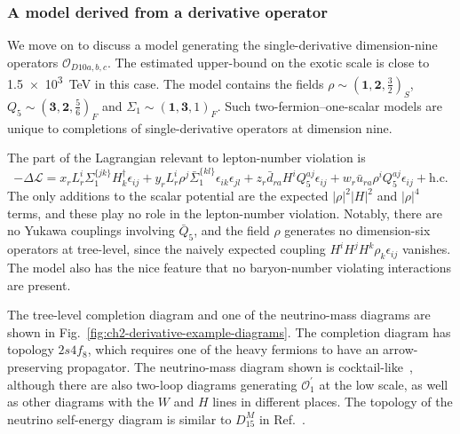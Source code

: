 \subsubsection{A model derived from a derivative operator}

We move on to discuss a model generating the single-derivative dimension-nine
operators $\mathcal{O}_{D10a,b,c}$. The estimated upper-bound on the exotic
scale is close to \SI{1.5e3}{\TeV} in this case. The model contains the fields
$\rho \sim (\mathbf{1}, \mathbf{2}, \tfrac{3}{2})_{S}$,
$Q_{5} \sim (\mathbf{3}, \mathbf{2}, \tfrac{5}{6})_{F}$ and
$\Sigma_{1} \sim (\mathbf{1}, \mathbf{3}, 1)_{F}$. Such two-fermion--one-scalar
models are unique to completions of single-derivative operators at dimension
nine.

The part of the Lagrangian relevant to lepton-number violation is
\begin{equation}
  - \Delta \mathscr{L} = x_{r} L_{r}^{i} \Sigma_{1}^{\{jk\}} H^{\dagger}_{k} \epsilon_{ij} + y_{r} L_{r}^{i} \rho^{j} \bar{\Sigma}_{1}^{\{kl\}}\epsilon_{ik}\epsilon_{jl} + z_{r} \bar{d}_{ra} H^{i} Q^{aj}_{5} \epsilon_{ij} + w_{r} \bar{u}_{ra} \rho^{i} Q_{5}^{aj} \epsilon_{ij} + \text{h.c.}
\end{equation}
The only additions to the scalar potential are the expected $|\rho|^{2}|H|^{2}$
and $|\rho|^{4}$ terms, and these play no role in the lepton-number violation.
Notably, there are no Yukawa couplings involving $\bar{Q}_{5}$, and the field
$\rho$ generates no dimension-six operators at tree-level, since the naively
expected coupling $H^{i}H^{j}H^{k}\rho_{k} \epsilon_{ij}$ vanishes. The model
also has the nice feature that no baryon-number violating interactions are
present.

The tree-level completion diagram and one of the neutrino-mass diagrams are
shown in Fig.~\ref{fig:ch2-derivative-example-diagrams}. The completion diagram has
topology $2s4f_{8}$, which requires one of the heavy fermions to have an
arrow-preserving propagator. The neutrino-mass diagram shown is
cocktail-like~\cite{Gustafsson:2012vj}, although there are also two-loop diagrams generating
$\mathcal{O}_{1}^{\prime}$ at the low scale, as well as other diagrams with the
$W$ and $H$ lines in different places. The topology of the neutrino self-energy
diagram is similar to $D^{M}_{15}$ in Ref.~\cite{Cepedello:2018rfh}.

